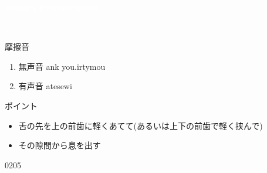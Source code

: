 \documentclass[aspectratio=169,xcolor={dvipsnames,table}]{beamer}
\begin{document}
\begin{frame}
\centering
  \textcolor{white}{\Huge\bfseries Today's Pronunciation}\pause

 \vspace{30pt}

  \textcolor{white}{\Huge\bfseries {}, }

\end{frame}
 \begin{frame}[plain,label=slide_Th]{摩擦音}

\large

\begin{enumerate}
 \item  無声音 \hspace{20pt}ank you.\hspace{1\zw}irty\hspace{1\zw}mou
 \item  有声音 \hspace{20pt}at\hspace{1\zw}ese\hspace{1\zw}wi
\end{enumerate}

\vspace*{20pt}

\normalsize
ポイント

\begin{itemize}[circle]
 \item 舌の先を上の前歯に軽くあてて(あるいは上下の前歯で軽く挟んで)
 \item その隙間から息を出す
 
\end{itemize}
\hfill{\tiny 0205}\,{\scriptsize {}}

\end{frame}
\end{document}

